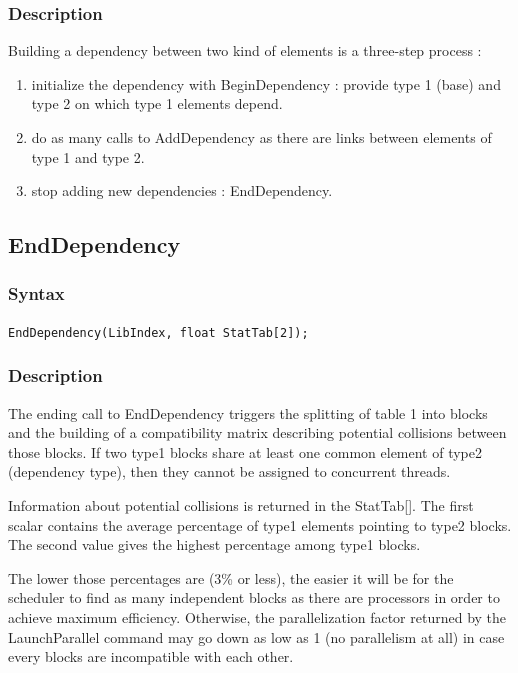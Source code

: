\documentclass[a4paper,12pt]{article}
\begin{document}
\subsubsection*{Description}
Building a dependency between two kind of elements is a three-step process :

\begin{enumerate}
	\item initialize the dependency with BeginDependency : provide type 1 (base) and type 2 on which type 1 elements depend.
	\item do as many calls to AddDependency as there are links between elements of type 1 and type 2.
	\item stop adding new dependencies : EndDependency.
\end{enumerate}


\subsection{EndDependency}

\subsubsection*{Syntax}
\tt{EndDependency(LibIndex, float StatTab[2]);}
\normalfont

\subsubsection*{Description}
\label{collisions}

The ending call to EndDependency triggers the splitting of table 1 into blocks and the building of a compatibility matrix describing potential collisions between those blocks. If two type1 blocks share at least one common element of type2 (dependency type), then they cannot be assigned to concurrent threads.

Information about potential collisions is returned in the StatTab[]. The first scalar contains the average percentage of type1 elements pointing to type2 blocks. The second value gives the highest percentage among type1 blocks.

The lower those percentages are (3\% or less), the easier it will be for the scheduler to find as many independent blocks as there are processors in order to achieve maximum efficiency. Otherwise, the parallelization factor returned by the LaunchParallel command may go down as low as 1 (no parallelism at all) in case every blocks are incompatible with each other.
\end{document}
